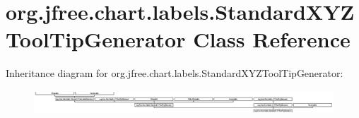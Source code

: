 \hypertarget{classorg_1_1jfree_1_1chart_1_1labels_1_1_standard_x_y_z_tool_tip_generator}{}\section{org.\+jfree.\+chart.\+labels.\+Standard\+X\+Y\+Z\+Tool\+Tip\+Generator Class Reference}
\label{classorg_1_1jfree_1_1chart_1_1labels_1_1_standard_x_y_z_tool_tip_generator}
Inheritance diagram for org.\+jfree.\+chart.\+labels.\+Standard\+X\+Y\+Z\+Tool\+Tip\+Generator\+:\begin{figure}[H]
\begin{center}
\leavevmode
\includegraphics[height=0.877743cm]{classorg_1_1jfree_1_1chart_1_1labels_1_1_standard_x_y_z_tool_tip_generator}
\end{center}
\end{figure}
